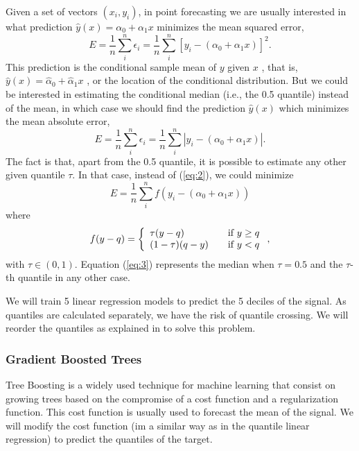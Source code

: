 \documentclass[a4paper,twocolumn,5p]{elsarticle}
\begin{document}
Given a 
set of vectors $(x_i, y_i)$, in point forecasting we are usually 
interested in what prediction $\hat y(x) = \alpha_0 + \alpha_1 x$
minimizes the mean squared error,
\begin{equation}
  \label{eq:1}
  E = \frac{1}{n} \sum^n_i \epsilon_i =
  \frac{1}{n} \sum^n_i [ y_i - (\alpha_0 + \alpha_1 x) ]^2.
\end{equation}
This prediction is the conditional sample mean of $y$ given $x$ , that
 is, $\hat y(x) = \hat\alpha_0 + \hat\alpha_1 x$
, or the location of the conditional distribution. But we could be
interested in estimating the conditional median (i.e., the 0.5
quantile) instead of the mean, in which case we should find the
prediction $\hat y(x)$ which minimizes the mean absolute error,
\begin{equation}
  \label{eq:2}
  E = \frac{1}{n} \sum^n_i \epsilon_i =
  \frac{1}{n} \sum^n_i | y_i - (\alpha_0 + \alpha_1 x) |.
\end{equation}
The fact is that, apart from the 0.5 quantile, it is possible to
estimate any other given quantile $\tau$. In that case, instead of
(\ref{eq:2}), we could minimize
\begin{equation}
  \label{eq:3}
E= \frac{1}{n} \sum^n_i f( y_i - (\alpha_0 + \alpha_1 x))
\end{equation}
where
\begin{equation}
  \label{eq:4}
  f(y-q) = \left\{ 
\begin{array}{l l}
\tau (y-q) & \quad \mbox{if $y \ge q$}\\
(1-\tau) (q-y) & \quad \mbox{if $y < q$}\\
\end{array} \right.,
\end{equation}
with $\tau \in (0,1)$. Equation (\ref{eq:3}) represents the
median when $\tau=0.5$ and the $\tau$-th quantile in any other case.

We will train 5 linear regression models to predict the 5 deciles of the signal. 
As quantiles are 
calculated separately, we have the risk of quantile crossing.
We will reorder the quantiles as explained 
in \cite{cross} to solve this problem.

\subsubsection{Gradient Boosted Trees}

Tree Boosting \cite{friedman_greedy_2001} is a widely used technique for machine learning 
that consist on growing trees based on the compromise 
of a cost function and a regularization function. This cost function is usually 
used to forecast 
the mean of the signal. We will modify the cost function (im a similar way as in 
the quantile linear regression) to predict the quantiles of the target. 
\end{document}
